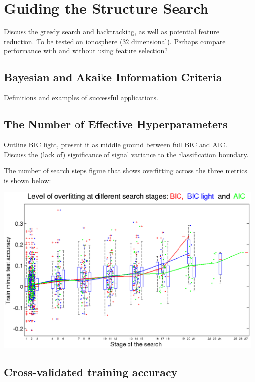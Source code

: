 \documentclass[a4paper,12pt ]{report}
\begin{document}
 \clearpage

\section{Guiding the Structure Search}

Discuss the greedy search and backtracking, as well as potential feature reduction. To be tested on ionosphere (32 dimensional). Perhaps compare performance with and without using feature selection?

\subsection{Bayesian and Akaike Information Criteria}

Definitions and examples of successful applications. 

\subsection{The Number of Effective Hyperparameters}

Outline BIC light, present it as middle ground between full BIC and AIC. Discuss the (lack of) significance of signal variance to the classification boundary. 

The number of search steps figure that shows overfitting across the three metrics is shown below: 

\includegraphics[scale=0.37]{figures/measureoverfit.png}

\subsection{Cross-validated training accuracy}
\end{document}
